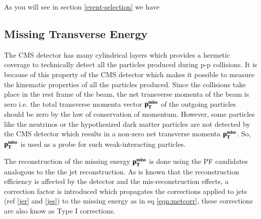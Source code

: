 As you will see in section \ref{event-selection} we have 
\begin{table}
\centering
\caption{b-tag working points used in the analysis}
\vspace{3mm}
\label{tab:btagwp}
\end{table}

\subsection{Missing Transverse Energy}
The CMS detector has many cylindrical layers which provides a hermetic coverage to technically detect all the particles produced during p-p collisions. It is because of this property of the CMS detector which makes it possible to measure the kinematic properties of all the particles produced. Since the collisions take place in the rest frame of the beam, the net transverse momenta of the beam is zero i.e. the total transverse momenta vector $\bf{p_{T}^{miss}}$ of the outgoing particles should be zero by the law of conservation of momentum. However, some particles like the neutrinos or the hypothesized dark matter particles are not detected by the CMS detector which results in a non-zero net transverse momenta $\bf{p_{T}^{miss}}$. So, $\bf{p_{T}^{miss}}$ is used as a probe for such weak-interacting particles.

The reconstruction of the missing energy $\bf{p_{T}^{miss}}$ is done using the PF candidates analogous to the the jet reconstruction. As is known that the reconstruction efficiency is affected by the detector and the mis-reconstruction effects, a correction factor is introduced which propagates the corrections applied to jets (ref \ref{jer} and \ref{jes}) to the missing energy as in eq \ref{eqn:metcorr}, these corrections are also know as Type I corrections.



